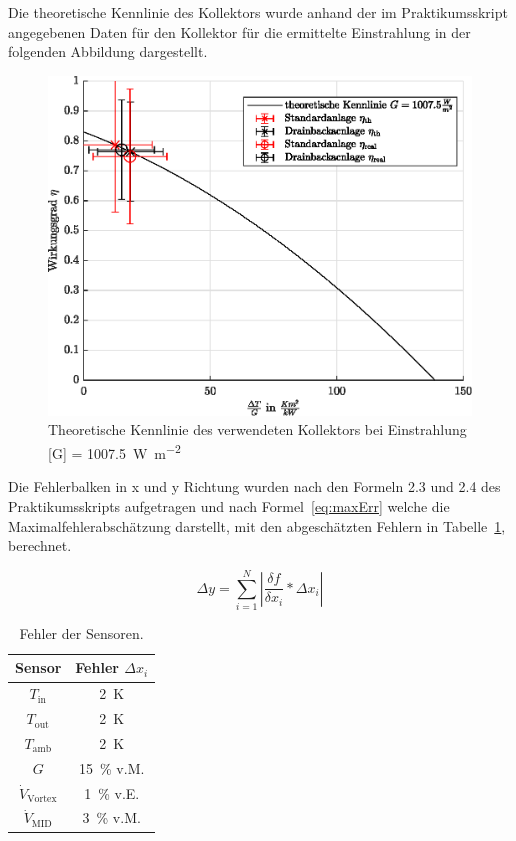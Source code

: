 Die theoretische Kennlinie des Kollektors wurde anhand der im Praktikumsskript angegebenen Daten für den Kollektor für die ermittelte Einstrahlung in der folgenden Abbildung dargestellt.

\begin{figure}[H]
	\centering
	\includegraphics[height=0.3\textheight]{../DATA/KennlinieTheo.eps}
	\caption[Theoretische Kennlinie]{Theoretische Kennlinie des verwendeten Kollektors bei Einstrahlung [G] = \SI{1007.5}{\watt\per\meter\squared}}
	\label{fig:KennKoll}
\end{figure}

Die Fehlerbalken in x und y Richtung wurden nach den Formeln 2.3 und 2.4 des Praktikumsskripts aufgetragen und nach Formel~\eqref{eq:maxErr} welche die Maximalfehlerabschätzung darstellt, mit den abgeschätzten Fehlern in Tabelle~\ref{tab:SensErr}, berechnet.

\begin{equation}\label{eq:maxErr}
	\Delta y = \sum_{i=1}^{N}\left|\frac{\delta f}{\delta x_{i}}*\Delta x_{i}\right|
\end{equation}

\begin{table}[H]
	\centering
	\caption{Fehler der Sensoren.}
	\label{tab:SensErr}
	\begin{tabular}{cc}
		\toprule
		Sensor & Fehler $\Delta x_{i}$ \\
		\midrule
		$T_{\text{in}}$	& \SI{2}{\kelvin} \\
		$T_{\text{out}}$	& \SI{2}{\kelvin} \\
		$T_{\text{amb}}$	& \SI{2}{\kelvin} \\
		$G$		& \SI{15}{\percent} v.M. \\
		$\dot{V}_{\text{Vortex}}$ & \SI{1}{\percent} v.E. \\
		$\dot{V}_{\text{MID}}$ & \SI{3}{\percent} v.M. \\
		\bottomrule
	\end{tabular}
\end{table}


